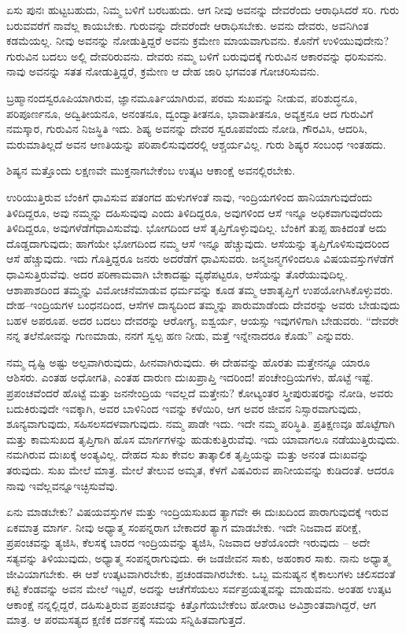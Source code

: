 ಏಸು ಪುನಃ ಹುಟ್ಟಬಹುದು, ನಿಮ್ಮ ಬಳಿಗೆ ಬರಬಹುದು. ಆಗ ನೀವು ಅವನನ್ನು ದೇವರೆಂದು ಆರಾಧಿಸಿದರೆ ಸರಿ. ಗುರು ಬರುವವರೆಗೆ ನಾವೆಲ್ಲ ಕಾಯಬೇಕು. ಗುರುವನ್ನು ದೇವರೆಂದೇ ಆರಾಧಿಸಬೇಕು. ಅವನು ದೇವರು, ಅವನಿಗಿಂತ ಕಡಮೆಯಲ್ಲ. ನೀವು ಅವನನ್ನು ನೋಡುತ್ತಿದ್ದರೆ ಅವನು ಕ್ರಮೇಣ ಮಾಯವಾಗುವನು. ಕೊನೆಗೆ ಉಳಿಯುವುದೇನು? ಗುರುವಿನ ಬದಲು ಅಲ್ಲಿ ದೇವರಿರುವನು. ದೇವರು ನಮ್ಮ ಬಳಿಗೆ ಬರುವುದಕ್ಕೆ ಗುರುವಿನ ಆಕಾರವನ್ನು ಧರಿಸುವನು. ನಾವು ಅವನನ್ನು ಸತತ ನೋಡುತ್ತಿದ್ದರೆ, ಕ್ರಮೇಣ ಆ ದೇಹ ಜಾರಿ ಭಗವಂತ ಗೋಚರಿಸುವನು.

ಬ್ರಹ್ಮಾನಂದಸ್ವರೂಪಿಯಾಗಿರುವ, ಜ್ಞಾನಮೂರ್ತಿಯಾಗಿರುವ, ಪರಮ ಸುಖವನ್ನು ನೀಡುವ, ಪರಿಶುದ್ಧನೂ, ಪರಿಪೂರ್ಣನೂ, ಅದ್ವಿತೀಯನೂ, ಅನಂತನೂ, ದ್ವಂದ್ವಾತೀತನೂ, ಭಾವಾತೀತನೂ, ಅವ್ಯಕ್ತನೂ ಆದ ಗುರುವಿಗೆ ನಮಸ್ಕಾರ, ಗುರುವಿನ ನಿಜಸ್ಥಿತಿ ಇದು. ಶಿಷ್ಯ ಅವನನ್ನು ದೇವರ ಸ್ವರೂಪವೆಂದು ನೋಡಿ, ಗೌರವಿಸಿ, ಆದರಿಸಿ, ಮರುಮಾತಿಲ್ಲದೆ ಅವನ ಆಣತಿಯನ್ನು ಪರಿಪಾಲಿಸುವುದರಲ್ಲಿ ಆಶ್ಚರ್ಯವಿಲ್ಲ. ಗುರು ಶಿಷ್ಯರ ಸಂಬಂಧ ಇಂತಹದು.

ಶಿಷ್ಯನ ಮತ್ತೊಂದು ಲಕ್ಷಣವೇ ಮುಕ್ತನಾಗಬೇಕೆಂಬ ಉತ್ಕಟ ಆಕಾಂಕ್ಷೆ ಅವನಲ್ಲಿರಬೇಕು.

ಉರಿಯುತ್ತಿರುವ ಬೆಂಕಿಗೆ ಧಾವಿಸುವ ಪತಂಗದ ಹುಳುಗಳಂತೆ ನಾವು, ಇಂದ್ರಿಯಗಳಿಂದ ಹಾನಿಯಾಗುವುದೆಂದು ತಿಳಿದಿದ್ದರೂ, ಅವು ನಮ್ಮನ್ನು ದಹಿಸುವುವು ಎಂದು ತಿಳಿದಿದ್ದರೂ, ಅವುಗಳಿಂದ ಆಸೆ ಇನ್ನೂ ಅಧಿಕವಾಗುವುದೆಂದು ತಿಳಿದಿದ್ದರೂ, ಅವುಗಳೆಡೆಗೆ\break ಧಾವಿಸುವೆವು. ಭೋಗದಿಂದ ಆಸೆ ತೃಪ್ತಿಗೊಳ್ಳುವುದಿಲ್ಲ. ಬೆಂಕಿಗೆ ತುಪ್ಪ ಹಾಕಿದಂತೆ ಅದು ದೊಡ್ಡದಾಗುವುದು; ಹಾಗೆಯೇ ಭೋಗದಿಂದ ನಮ್ಮ ಆಸೆ ಇನ್ನೂ ಹೆಚ್ಚುವುದು. ಆಸೆಯನ್ನು ತೃಪ್ತಿಗೊಳಿಸುವುದರಿಂದ ಆಸೆ ಹೆಚ್ಚುವುದು. ಇದು ಗೊತ್ತಿದ್ದರೂ ಜನರು ಅದರೆಡೆಗೆ ಧಾವಿಸುವರು. ಜನ್ಮಜನ್ಮಗಳಿಂದಲೂ ವಿಷಯವಸ್ತುಗಳೆಡೆಗೆ ಧಾವಿಸುತ್ತಿರುವೆವು. ಅದರ ಪರಿಣಾಮವಾಗಿ ಬೇಕಾದಷ್ಟು ವ್ಯಥೆಪಟ್ಟರೂ, ಆಸೆಯನ್ನು ತೊರೆಯುವುದಿಲ್ಲ. ಆಶಾಪಾಶದಿಂದ ತಮ್ಮನ್ನು ವಿಮೋಚನೆಮಾಡುವ ಧರ್ಮವನ್ನು ಕೂಡ ತಮ್ಮ ಆಶಾತೃಪ್ತಿಗೆ ಉಪಯೋಗಿಸಿಕೊಳ್ಳುವರು. ದೇಹ–ಇಂದ್ರಿಯಗಳ ಬಂಧನದಿಂದ, ಆಸೆಗಳ ದಾಸ್ಯದಿಂದ ತಮ್ಮನ್ನು ಪಾರುಮಾಡೆಂದು ದೇವರನ್ನು ಅವರು ಬೇಡುವುದು ಬಹಳ ಅಪರೂಪ. ಅದರ ಬದಲು ದೇವರನ್ನು ಆರೋಗ್ಯ, ಐಶ್ವರ್ಯ, ಆಯಸ್ಸು ಇವುಗಳಿಗಾಗಿ ಬೇಡುವರು. “ದೇವರೇ ನನ್ನ ತಲೆನೋವನ್ನು ಗುಣಮಾಡು, ನನಗೆ ಸ್ವಲ್ಪ ಹಣ ನೀಡು, ಮತ್ತೆ ಇನ್ನೇನಾದರೂ ಕೊಡು'' ಎನ್ನುವರು.

ನಮ್ಮ ದೃಷ್ಟಿ ಅಷ್ಟು ಅಲ್ಪವಾಗಿರುವುದು, ಹೀನವಾಗಿರುವುದು. ಈ ದೇಹವನ್ನು ಹೊರತು ಮತ್ತೇನನ್ನೂ ಯಾರೂ ಆಶಿಸರು. ಎಂತಹ ಅಧೋಗತಿ, ಎಂತಹ ದಾರುಣ ದುಃಖಪ್ರಾಪ್ತಿ ಇದರಿಂದ! ಪಂಚೇಂದ್ರಿಯಗಳು, ಹೊಟ್ಟೆ ಇಷ್ಟೆ. ಪ್ರಪಂಚವೆಂದರೆ ಹೊಟ್ಟೆ ಮತ್ತು ಜನನೇಂದ್ರಿಯ ಇವಲ್ಲದೆ ಮತ್ತೇನು? ಕೋಟ್ಯಂತರ ಸ್ತ್ರೀಪುರುಷರನ್ನು ನೋಡಿ, ಅವರು ಬದುಕಿರುವುದೇ ಇವಕ್ಕಾಗಿ, ಅವರ ಬಾಳಿನಿಂದ ಇವನ್ನು ಕಳೆಯಿರಿ, ಆಗ ಅವರ ಜೀವನ ನಿಸ್ಸಾರವಾಗುವುದು, ಶೂನ್ಯವಾಗುವುದು, ಸಹಿಸಲಸದಳವಾಗುವುದು. ನಮ್ಮ ಪಾಡೇ ಇದು. ಇದೇ ನಮ್ಮ ಪರಿಸ್ಥಿತಿ. ಪ್ರತಿಕ್ಷಣವೂ ಹೊಟ್ಟೆಗಾಗಿ ಮತ್ತು ಕಾಮಸುಖದ ತೃಪ್ತಿಗಾಗಿ ಹೊಸ ಮಾರ್ಗಗಳನ್ನು ಹುಡುಕುತ್ತಿರುವೆವು. ಇದು ಯಾವಾಗಲೂ ನಡೆಯುತ್ತಿರುವುದು. ನಮಗಿರುವ ದುಃಖಕ್ಕೆ ಅಂತ್ಯವಿಲ್ಲ. ದೇಹದ ಸುಖ ಕೇವಲ ತಾತ್ಕಾಲಿಕ ತೃಪ್ತಿಯನ್ನು ಮತ್ತು ಅನಂತ ದುಃಖವನ್ನು ತರುವುದು. ಸುಖ ಮೇಲೆ ಮಾತ್ರ. ಮೇಲೆ ತೇಲುವ ಅಮೃತ, ಕೆಳಗೆ ವಿಷವಿರುವ ಪಾನೀಯವನ್ನು ಕುಡಿದಂತೆ. ಆದರೂ ನಾವು ಇವೆಲ್ಲವನ್ನೂ\break ಇಚ್ಛಿಸುವೆವು.

ಏನು ಮಾಡಬೇಕು? ವಿಷಯವಸ್ತುಗಳ ಮತ್ತು ಇಂದ್ರಿಯಸುಖದ ತ್ಯಾಗವೇ ಈ ದುಃಖದಿಂದ ಪಾರಾಗುವುದಕ್ಕೆ ಇರುವ ಏಕಮಾತ್ರ ಮಾರ್ಗ. ನೀವು ಅಧ್ಯಾತ್ಮ ಸಂಪನ್ನರಾಗ ಬೇಕಾದರೆ ತ್ಯಾಗ ಮಾಡಬೇಕು. ಇದೇ ನಿಜವಾದ ಪರೀಕ್ಷೆ, ಪ್ರಪಂಚವನ್ನು ತ್ಯಜಿಸಿ, ಕೆಲಸಕ್ಕೆ ಬಾರದ ಇಂದ್ರಿಯವನ್ನು ತ್ಯಜಿಸಿ, ನಿಜವಾದ ಆಶೆಯೊಂದೇ ಇರುವುದು – ಅದೇ ಸತ್ಯವನ್ನು ತಿಳಿಯುವುದು, ಅಧ್ಯಾತ್ಮ ಸಂಪನ್ನರಾಗುವುದು. ಈ ಜಡಜೀವನ ಸಾಕು, ಅಹಂಕಾರ ಸಾಕು. ನಾನು ಅಧ್ಯಾತ್ಮ ಜೀವಿಯಾಗಬೇಕು. ಈ ಆಶೆ ಉತ್ಕಟವಾಗಿರಬೇಕು, ಪ್ರಚಂಡವಾಗಿರಬೇಕು. ಒಬ್ಬ ಮನುಷ್ಯನ ಕೈಕಾಲುಗಳು ಚಲಿಸದಂತೆ ಕಟ್ಟಿ ಕೆಂಡವನ್ನು ಅವನ ಮೇಲೆ ಇಟ್ಟರೆ, ಅದನ್ನು ಆಚೆಗೆಸೆಯಲು ಸರ್ವಪ್ರಯತ್ನವನ್ನು ಮಾಡುವನು. ಅಂತಹ ಉತ್ಕಟ ಆಕಾಂಕ್ಷೆ ನನ್ನಲ್ಲಿದ್ದರೆ, ದಹಿಸುತ್ತಿರುವ ಪ್ರಪಂಚವನ್ನು ಕಿತ್ತೊಗೆಯಬೇಕೆಂಬ ಹೋರಾಟ ಅವಿಶ್ರಾಂತವಾಗಿದ್ದರೆ, ಆಗ ಮಾತ್ರ. ಆ ಪರಮಸತ್ಯದ ಕ್ಷಣಿಕ ದರ್ಶನಕ್ಕೆ ಸಮಯ ಸನ್ನಿಹಿತವಾಗುತ್ತದೆ.


